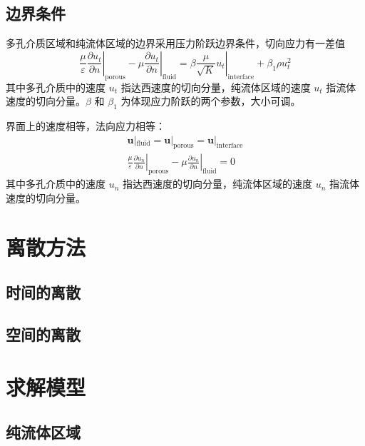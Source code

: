 \subsection{边界条件} %

多孔介质区域和纯流体区域的边界采用压力阶跃边界条件，切向应力有一差值
\begin{equation}
	\left.\frac{\mu}{\varepsilon}\frac{\partial u_t}{\partial n}\right|_{\mathrm{porous}} -
	\left.\mu\frac{\partial u_t}{\partial n}\right|_{\mathrm{fluid}} =
	\left.\beta\frac{\mu}{\sqrt K}u_t\right|_{\mathrm{interface}} + \beta_1\rho u_t^2
\end{equation}
其中多孔介质中的速度 $u_t$ 指达西速度的切向分量，纯流体区域的速度 $u_t$ 指流体速度的切向分量。$\beta$ 和 $\beta_1$ 为体现应力阶跃的两个参数，大小可调。

界面上的速度相等，法向应力相等：
\begin{gather}
	\bm{u}|_{\mathrm{fluid}} = \bm{u}|_{\mathrm{porous}} = \bm{u}|_{\mathrm{interface}} \\
	\left.\frac{\mu}{\varepsilon}\frac{\partial u_n}{\partial n}\right|_{\mathrm{porous}} -
	\left.\mu\frac{\partial u_n}{\partial n}\right|_{\mathrm{fluid}} = 0
\end{gather}
其中多孔介质中的速度 $u_n$ 指达西速度的切向分量，纯流体区域的速度 $u_n$ 指流体速度的切向分量。

\section{离散方法}

\subsection{时间的离散}

\subsection{空间的离散}

\section{求解模型} %

\subsection{纯流体区域}

